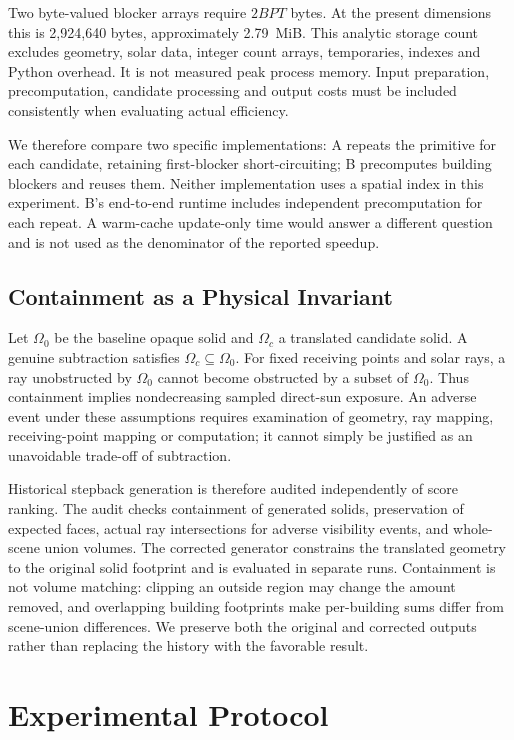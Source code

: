 \documentclass{llncs}
\begin{document}
Two byte-valued blocker arrays require $2BPT$ bytes. At the present dimensions this is 2,924,640 bytes, approximately 2.79~MiB. This analytic storage count excludes geometry, solar data, integer count arrays, temporaries, indexes and Python overhead. It is not measured peak process memory. Input preparation, precomputation, candidate processing and output costs must be included consistently when evaluating actual efficiency.

We therefore compare two specific implementations: A repeats the primitive for each candidate, retaining first-blocker short-circuiting; B precomputes building blockers and reuses them. Neither implementation uses a spatial index in this experiment. B's end-to-end runtime includes independent precomputation for each repeat. A warm-cache update-only time would answer a different question and is not used as the denominator of the reported speedup.

\subsection{Containment as a Physical Invariant}
Let $\Omega_0$ be the baseline opaque solid and $\Omega_c$ a translated candidate solid. A genuine subtraction satisfies $\Omega_c\subseteq\Omega_0$. For fixed receiving points and solar rays, a ray unobstructed by $\Omega_0$ cannot become obstructed by a subset of $\Omega_0$. Thus containment implies nondecreasing sampled direct-sun exposure. An adverse event under these assumptions requires examination of geometry, ray mapping, receiving-point mapping or computation; it cannot simply be justified as an unavoidable trade-off of subtraction.

Historical stepback generation is therefore audited independently of score ranking. The audit checks containment of generated solids, preservation of expected faces, actual ray intersections for adverse visibility events, and whole-scene union volumes. The corrected generator constrains the translated geometry to the original solid footprint and is evaluated in separate runs. Containment is not volume matching: clipping an outside region may change the amount removed, and overlapping building footprints make per-building sums differ from scene-union differences. We preserve both the original and corrected outputs rather than replacing the history with the favorable result.

\section{Experimental Protocol}
\end{document}
